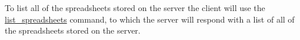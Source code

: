 To list all of the spreadsheets stored on the server the client will use 
the \hyperref[sec:message:list]{list\_spreadsheets} command, to which the 
server will respond with a list of all of the spreadsheets stored on the 
server.